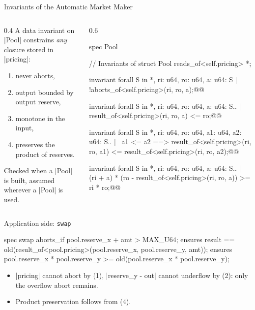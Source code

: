 \documentclass[aspectratio=169,11pt]{beamer}
\begin{document}
\begin{frame}[fragile]{Invariants of the Automatic Market Maker}
  \begin{columns}[c]
    \begin{column}{0.4\textwidth}
      A data invariant on |Pool| constrains \emph{any} closure stored in |pricing|:
      \begin{enumerate}
        \item never aborts,
        \item output bounded by output reserve,
        \item monotone in the input,
        \item preserves the product of reserves.
      \end{enumerate}
      \medskip

      Checked when a |Pool| is built, assumed wherever a |Pool| is used.
    \end{column}
    \begin{column}{0.6\textwidth}
\begin{MoveSmall}
spec Pool { // Invariants of struct Pool
  reads_of<self.pricing> *;

  invariant forall S in *, ri: u64, ro: u64, a: u64:
    S |~ !aborts_of<self.pricing>(ri, ro, a);@@

  invariant forall S in *, ri: u64, ro: u64, a: u64:
    S.. |~ result_of<self.pricing>(ri, ro, a) <= ro;@@

  invariant forall S in *, ri: u64, ro: u64, a1: u64, a2: u64:
    S.. |~ a1 <= a2 ==> result_of<self.pricing>(ri, ro, a1)
      <= result_of<self.pricing>(ri, ro, a2);@@

  invariant forall S in *, ri: u64, ro: u64, a: u64:
    S.. |~ (ri + a)
             * (ro - result_of<self.pricing>(ri, ro, a))
             >= ri * ro;@@
}
\end{MoveSmall}
    \end{column}
  \end{columns}
\end{frame}

\begin{frame}[fragile]{Application side: \texttt{swap}}
\begin{Move}
spec swap {
  aborts_if pool.reserve_x + amt > MAX_U64;
  ensures result == old(result_of<pool.pricing>(pool.reserve_x, pool.reserve_y, amt));
  ensures pool.reserve_x * pool.reserve_y >= old(pool.reserve_x * pool.reserve_y);
}
\end{Move}
  \medskip
  \begin{itemize}
    \item |pricing| cannot abort by (1), |reserve_y - out| cannot underflow by (2): only the overflow abort remains.
    \item Product preservation follows from (4).
  \end{itemize}
\end{frame}
\end{document}
